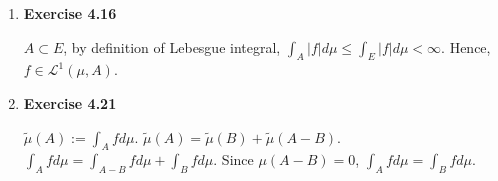 \documentclass[12pt, letterpaper,bibtotoc, tablecaptionabove, figurecaptionabove]{article}
\begin{document}
\begin{enumerate}
\item{\bf{Exercise 4.16}}
\begin{itemize}
$A\subset  E$, by definition of Lebesgue integral, $\int_A |f|d\mu\leq\int_E|f|d\mu<\infty$. Hence, $f\in\mathcal L^1(\mu,A)$. 
\end{itemize}

\item{\bf{Exercise 4.21}}
\begin{itemize}
$\tilde\mu(A):=\int_Afd\mu$. $\tilde\mu(A)=\tilde\mu(B)+\tilde\mu(A-B)$.
$\int_A fd\mu=\int_{A-B}f d\mu+\int_B f d\mu$. Since $\mu(A-B)=0$, $\int_A fd\mu=\int_B fd\mu$.
\end{itemize}




\end{enumerate}
\end{document}
